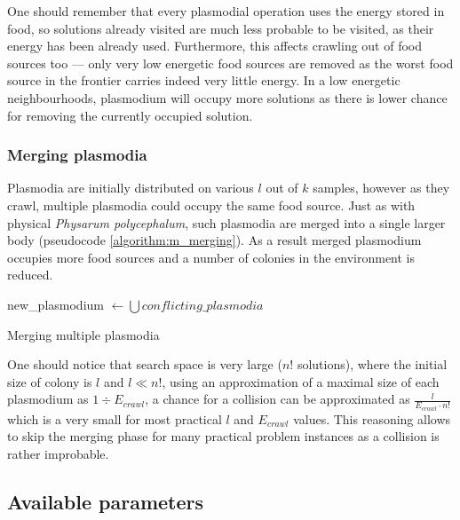 One should remember that every plasmodial operation uses the energy stored in food, so solutions already visited are much less probable to be visited, as their energy has been already used. Furthermore, this affects crawling out of food sources too --- only very low energetic food sources are removed as the worst food source in the frontier carries indeed very little energy. In a low energetic neighbourhoods, plasmodium will occupy more solutions as there is lower chance for removing the currently occupied solution.


\subsubsection{Merging plasmodia}

Plasmodia are initially distributed on various $l$ out of $k$ samples, however as they crawl, multiple plasmodia could occupy the same food source. Just as with physical \textit{Physarum polycephalum}, such plasmodia are merged into a single larger body (pseudocode \ref{algorithm:m_merging}). As a result merged plasmodium occupies more food sources and a number of colonies in the environment is reduced. 

\begin{algorithm}
  \BlankLine
  
  new\_plasmodium $\leftarrow \bigcup{conflicting\_plasmodia}$\;


  \;

  \caption{Merging multiple plasmodia}
  \label{algorithm:m_merging}
\end{algorithm}

One should notice that search space is very large ($n!$ solutions), where the initial size of colony is $l$ and $l \ll n!$, using an approximation of a maximal size of each plasmodium as $1 \div E_{crawl}$, a chance for a collision can be approximated as $\frac{l}{E_{crawl} \cdot n!}$ which is a very small for most practical $l$ and $E_{crawl}$ values. This reasoning allows to skip the merging phase for many practical problem instances as a collision is rather improbable.


\subsection{Available parameters}
\label{subsection:am_parameters}

